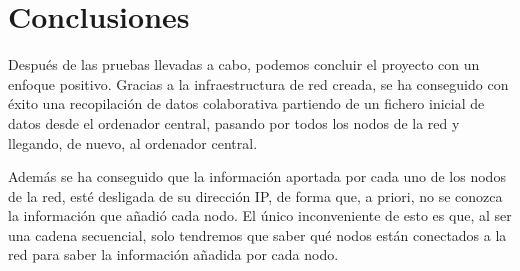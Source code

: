 \section{Conclusiones}
Después de las pruebas llevadas a cabo, podemos concluir el proyecto con un enfoque positivo. Gracias a la infraestructura de red creada, se ha conseguido con éxito una recopilación de datos colaborativa partiendo de un fichero inicial de datos desde el ordenador central, pasando por todos los nodos de la red y llegando, de nuevo, al ordenador central.

Además se ha conseguido que la información aportada por cada uno de los nodos de la red, esté desligada de su dirección IP, de forma que, a priori, no se conozca la información que añadió cada nodo. El único inconveniente de esto es que, al ser una cadena secuencial, solo tendremos que saber qué nodos están conectados a la red para saber la información añadida por cada nodo.

